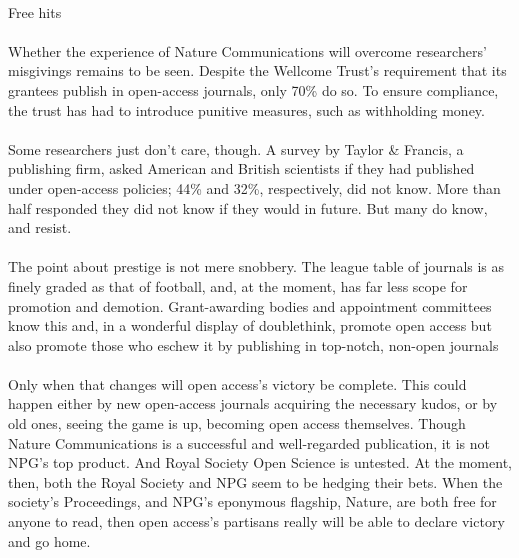 \documentclass[a4paper, 12pt, UTF8]{article}
\begin{document}
\paragraph*{}
    \begin{bfseries}
        \large
        Free hits
    \end{bfseries}

\paragraph*{}
    Whether the experience of Nature Communications will overcome researchers’ misgivings remains to be seen. Despite the Wellcome Trust’s requirement that its grantees publish in open-access journals, only 70\% do so. To ensure compliance, the trust has had to introduce punitive measures, such as withholding money.

\paragraph*{}
    Some researchers just don’t care, though. A survey by Taylor \& Francis, a publishing firm, asked American and British scientists if they had published under open-access policies; 44\% and 32\%, respectively, did not know. More than half responded they did not know if they would in future. But many do know, and resist.

\paragraph*{}
    The point about prestige is not mere snobbery. The league table of journals is as finely graded as that of football, and, at the moment, has far less scope for promotion and demotion. Grant-awarding bodies and appointment committees know this and, in a wonderful display of doublethink, promote open access but also promote those who eschew it by publishing in top-notch, non-open journals

\paragraph*{}
    Only when that changes will open access’s victory be complete. This could happen either by new open-access journals acquiring the necessary kudos, or by old ones, seeing the game is up, becoming open access themselves. Though Nature Communications is a successful and well-regarded publication, it is not NPG’s top product. And Royal Society Open Science is untested. At the moment, then, both the Royal Society and NPG seem to be hedging their bets. When the society’s Proceedings, and NPG’s eponymous flagship, Nature, are both free for anyone to read, then open access’s partisans really will be able to declare victory and go home.
\end{document}
